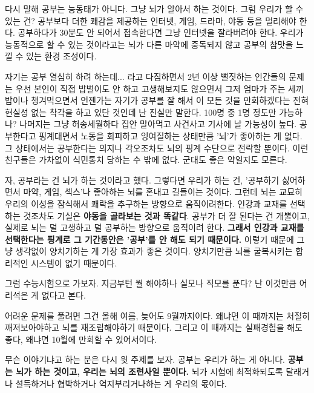 다시 말해 공부는 능동태가 아니다. 그냥 뇌가 알아서 하는 것이다.
그럼 우리가 할 수 있는 건?
공부보다 더한 쾌감을 제공하는 인터넷, 게임, 드라마, 야동 등을 멀리해야 한다.
공부하다가 30분도 안 되어서 접속한다면 그냥 인터넷을 잘라버려야 한다.
우리가 능동적으로 할 수 있는 것이라고는 뇌가 다른 마약에 중독되지 않고 공부의 참맛을 느낄 수 있는 환경 조성이다.
\vspace{5mm}

자기는 공부 열심히 하려 하는데... 라고 다짐하면서 2년 이상 뻘짓하는 인간들의 문제는
우선 본인이 직접 밥벌이도 안 하고 고생해보지도 않으면서 그저 엄마가 주는 세끼밥이나 챙겨먹으면서
언젠가는 자기가 공부를 잘 해서 이 모든 것을 만회하겠다는 전혀 현실성 없는 착각을 하고 있단 것인데
난 진실만 말한다. 100명 중 1명 정도만 가능하나? 나머지는 그냥 허송세월하다 집안 말아먹고 사건사고 기사에 날 가능성이 높다.
공부한다고 핑계대면서 노동을 회피하고 잉여질하는 상태만큼 '뇌'가 좋아하는 게 없다.
그 상태에서는 공부한다는 의지나 각오조차도 뇌의 핑계 수단으로 전락할 뿐이다.
이런 친구들은 가차없이 식민통치 당하는 수 밖에 없다. 군대도 좋은 약일지도 모른다.
\vspace{5mm}

자, 공부라는 건 뇌가 하는 것이라고 했다. 그렇다면 우리가 하는 건,
'공부하기 싫어하면서 마약, 게임, 섹스'나 좋아하는 뇌를 혼내고 길들이는 것이다.
그런데 뇌는 교묘히 우리의 이성을 잠식해서 쾌락을 추구하는 방향으로 움직이려한다.
인강과 교재를 선택하는 것조차도 기실은 \textbf{야동을 골라보는 것과 똑같다}.
공부가 더 잘 된다는 건 개뿔이고, 실제로 뇌는 덜 고생하고 덜 공부하는 방향으로 움직이려 한다.
\textbf{그래서 인강과 교재를 선택한다는 핑계로 그 기간동안은 '공부'를 안 해도 되기 때문이다.}
이렇기 때문에 그냥 생각없이 양치기하는 게 가장 효과가 좋은 것이다.
양치기만큼 뇌를 굴복시키는 합리적인 시스템이 없기 때문이다.
\vspace{5mm}

그럼 수능시험으로 가보자. 지금부턴 뭘 해야하나
실모나 직모를 푼다?
난 이것만큼 어리석은 게 없다고 본다.
\vspace{5mm}

어려운 문제를 풀려면 그건 올해 여름, 늦어도 9월까지이다.
왜냐면 이 때까지는 처절히 깨져보아야하고 뇌를 재조립해야하기 때문이다.
그리고 이 때까지는 실패경험을 해도 좋다, 왜냐면 10월에 만회할 수 있어서이다.
\vspace{5mm}

무슨 이야기냐고 하는 분은 다시 윗 주제를 보자. 공부는 우리가 하는 게 아니다.
\textbf{공부는 뇌가 하는 것이고, 우리는 뇌의 조련사일 뿐이다.}
뇌가 시험에 최적화되도록 달래거나 설득하거나 협박하거나 억지부리거나하는 게 우리의 몫이다.
\vspace{5mm}

